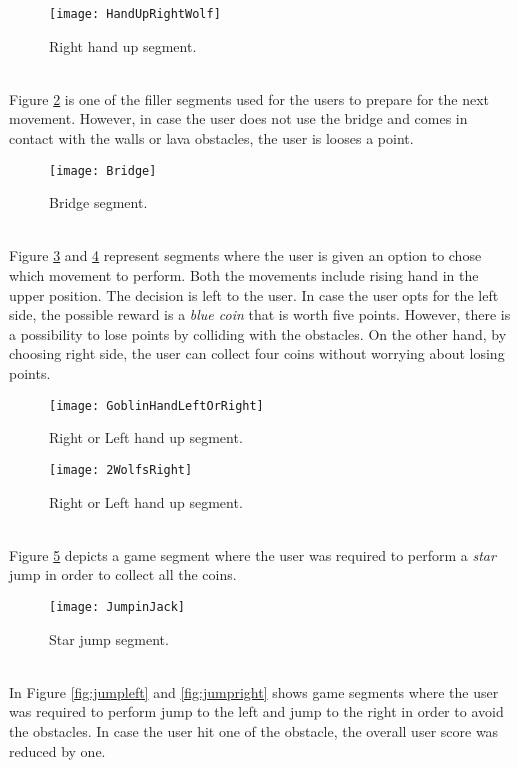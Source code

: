 \begin{figure}[h]
    \centering
    \texttt{[image: HandUpRightWolf]}
    \caption{Right hand up segment.}
    \label{fig:wolfRight}
\end{figure}\\
Figure \ref{fig:bridge} is one of the filler segments used for the users to prepare for the next movement. However, in case the user does not use the bridge and comes in contact with the walls or lava obstacles, the user is looses a point. \\
\begin{figure}[h]
    \centering
    \texttt{[image: Bridge]}
    \caption{Bridge segment.}
    \label{fig:bridge}
\end{figure}\\
Figure \ref{fig:goblin} and \ref{fig:2wolfs} represent segments where  the user is given an option to chose which movement to perform. Both the movements include rising hand in the upper position. The decision is left to the user. In case the user opts for the left side, the possible reward is a \textit{blue coin} that is worth five points. However, there is a possibility to lose points by colliding with the obstacles. On the other hand, by choosing right side, the user can collect four coins without worrying about losing points.\\
\begin{figure}[h]
    \centering
    \texttt{[image: GoblinHandLeftOrRight]}
    \caption{Right or Left hand up segment.}
    \label{fig:goblin}
\end{figure}
\begin{figure}[h]
    \centering
    \texttt{[image: 2WolfsRight]}
    \caption{Right or Left hand up segment.}
    \label{fig:2wolfs}
\end{figure}\\
Figure \ref{fig:star} depicts a game segment where the user was required to perform a \textit{star} jump in order to collect all the coins. \\
\begin{figure}[h]
    \centering
    \texttt{[image: JumpinJack]}
    \caption{Star jump segment.}
    \label{fig:star}
\end{figure}\\
In Figure \ref{fig:jumpleft} and \ref{fig:jumpright} shows game segments where the user was required to perform jump to the left and jump to the right in order to avoid the obstacles. In case the user hit one of the obstacle, the overall user score was reduced by one.\\
